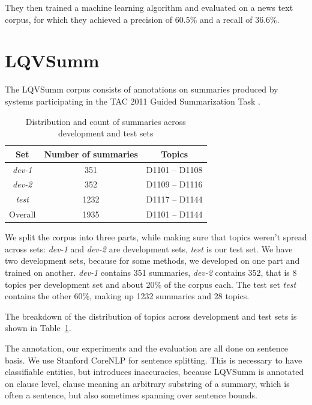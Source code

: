 \documentclass[a4paper,10pt]{scrartcl}
\theoremstyle{style}
\begin{document}
They then trained a machine learning algorithm \citep{cohen1996learning} and evaluated on a news text corpus, for which they achieved a precision of 60.5\% and a recall of 36.6\%.

\section{LQVSumm}
\label{corpus_study}
The LQVSumm corpus consists of annotations on summaries produced by systems participating in the TAC 2011 Guided Summarization Task \citep{owczarzak2011overview}.

\begin{table}
\begin{center}
\begin{tabular}{|c|c|c|}
\hline
\textbf{Set} & \textbf{Number of summaries} & \textbf{Topics}\\
\hline
\textit{dev-1} & 351 & D1101 -- D1108\\
\hline
\textit{dev-2} & 352 & D1109 -- D1116\\
\hline
\textit{test} & 1232 & D1117 -- D1144\\
\hline\hline
Overall & 1935 & D1101 -- D1144\\
\hline
\end{tabular}
\end{center}
\label{testsets}
\caption{Distribution and count of summaries across development and test sets}
\end{table}

We split the corpus into three parts, while making sure that topics weren't spread across sets: \textit{dev-1} and \textit{dev-2} are development sets, \textit{test} is our test set. We have two development sets, because for some methods, we developed on one part and trained on another.
\textit{dev-1} contains 351 summaries, \textit{dev-2} contains 352, that is 8 topics per development set and about 20\% of the corpus each.
The test set \textit{test} contains the other 60\%, making up 1232 summaries and 28 topics.

The breakdown of the distribution of topics across development and test sets is shown in Table~\ref{testsets}.

The annotation, our experiments and the evaluation are all done on sentence basis. We use Stanford CoreNLP \citep{manning-EtAl:2014:P14-5} for sentence splitting. This is necessary to have classifiable entities, but introduces inaccuracies, because LQVSumm is annotated on clause level, clause meaning an arbitrary substring of a summary, which is often a sentence, but also sometimes spanning over sentence bounds.
\end{document}
